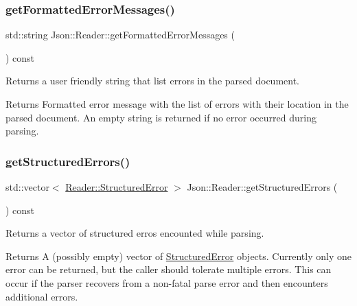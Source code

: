 \subsubsection{\texorpdfstring{get\+Formatted\+Error\+Messages()}{getFormattedErrorMessages()}}
{\footnotesize\ttfamily std\+::string Json\+::\+Reader\+::get\+Formatted\+Error\+Messages (\begin{DoxyParamCaption}{ }\end{DoxyParamCaption}) const}



Returns a user friendly string that list errors in the parsed document. 

\begin{DoxyReturn}{Returns}
Formatted error message with the list of errors with their location in the parsed document. An empty string is returned if no error occurred during parsing. 
\end{DoxyReturn}
\mbox{\label{class_json_1_1_reader_ae3d714e95bd98b27e296c607e408189b}} 
\subsubsection{\texorpdfstring{get\+Structured\+Errors()}{getStructuredErrors()}}
{\footnotesize\ttfamily std\+::vector$<$ \hyperlink{struct_json_1_1_reader_1_1_structured_error}{Reader\+::\+Structured\+Error} $>$ Json\+::\+Reader\+::get\+Structured\+Errors (\begin{DoxyParamCaption}{ }\end{DoxyParamCaption}) const}



Returns a vector of structured erros encounted while parsing. 

\begin{DoxyReturn}{Returns}
A (possibly empty) vector of \hyperlink{struct_json_1_1_reader_1_1_structured_error}{Structured\+Error} objects. Currently only one error can be returned, but the caller should tolerate multiple errors. This can occur if the parser recovers from a non-\/fatal parse error and then encounters additional errors. 
\end{DoxyReturn}
\mbox{\label{class_json_1_1_reader_a86cbb42b3e6d4a4d6416473b1a8f6ae7}} 

